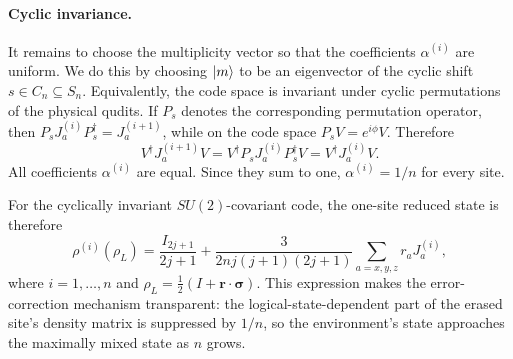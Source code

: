 \documentclass[10pt,twocolumn,superscriptaddress,aps,amsmath,amssymb,citeautoscript,floatfix,prx,longbibliography]{revtex4-2}
\theoremstyle{plain}
\theoremstyle{plain}
\theoremstyle{plain}
\theoremstyle{plain}
\theoremstyle{plain}
\theoremstyle{plain}
\begin{document}
\paragraph{Cyclic invariance.}
It remains to choose the multiplicity vector so that the coefficients $\alpha^{(i)}$ are uniform. We do this by choosing $\ket m$ to be an eigenvector of the cyclic shift $s\in C_n\subseteq S_n$. Equivalently, the code space is invariant under cyclic permutations of the physical qudits. If $P_s$ denotes the corresponding permutation operator, then $P_s J_a^{(i)}P_s^\dagger=J_a^{(i+1)}$, while on the code space $P_sV=e^{i\phi}V$. Therefore
\[
    V^\dagger J_a^{(i+1)}V
    =
    V^\dagger P_sJ_a^{(i)}P_s^\dagger V
    =
    V^\dagger J_a^{(i)}V .
\]
All coefficients $\alpha^{(i)}$ are equal. Since they sum to one, $\alpha^{(i)}=1/n$ for every site.

For the cyclically invariant $SU(2)$-covariant code, the one-site reduced state is therefore
\begin{equation}\label{eq:reduced_state_su2}
    \rho^{(i)}(\rho_L)
    =
    \frac{I_{2j+1}}{2j+1}
    +
    \frac{3}{2nj(j+1)(2j+1)}
    \sum_{a=x,y,z} r_a J_a^{(i)},
\end{equation}
where $i=1,\ldots,n$ and $\rho_L=\frac12(I+\mathbf r\cdot\boldsymbol\sigma)$. This expression makes the error-correction mechanism transparent: the logical-state-dependent part of the erased site's density matrix is suppressed by $1/n$, so the environment's state approaches the maximally mixed state as $n$ grows.
\end{document}
